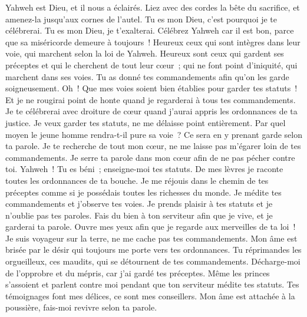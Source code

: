 \begin{multicols}{2}
Yahweh est Dieu, et il nous a éclairés. Liez avec des cordes la bête du sacrifice, et amenez-la jusqu'aux cornes de l'autel.
Tu es mon Dieu, c'est pourquoi je te célébrerai. Tu es mon Dieu, je t'exalterai.
Célébrez Yahweh car il est bon, parce que sa miséricorde demeure à toujours~!
\VerseOne{} Heureux ceux qui sont intègres dans leur voie, qui marchent selon la loi de Yahweh.
Heureux sont ceux qui gardent ses préceptes et qui le cherchent de tout leur cœur~;
qui ne font point d'iniquité, qui marchent dans ses voies.
Tu as donné tes commandements afin qu'on les garde soigneusement.
Oh~! Que mes voies soient bien établies pour garder tes statuts~!
Et je ne rougirai point de honte quand je regarderai à tous tes commandements.
Je te célébrerai avec droiture de cœur quand j'aurai appris les ordonnances de ta justice.
Je veux garder tes statuts, ne me délaisse point entièrement.
 Par quel moyen le jeune homme rendra-t-il pure sa voie~? Ce sera en y prenant garde selon ta parole.
Je te recherche de tout mon cœur, ne me laisse pas m'égarer loin de tes commandements.
Je serre ta parole dans mon cœur afin de ne pas pécher contre toi.
Yahweh~! Tu es béni~; enseigne-moi tes statuts.
De mes lèvres je raconte toutes les ordonnances de ta bouche.
Je me réjouis dans le chemin de tes préceptes comme si je possédais toutes les richesses du monde.
Je médite tes commandements et j'observe tes voies.
Je prends plaisir à tes statuts et je n'oublie pas tes paroles.
 Fais du bien à ton serviteur afin que je vive, et je garderai ta parole.
Ouvre mes yeux afin que je regarde aux merveilles de ta loi~!
Je suis voyageur sur la terre, ne me cache pas tes commandements.
Mon âme est brisée par le désir qui toujours me porte vers tes ordonnances.
Tu réprimandes les orgueilleux, ces maudits, qui se détournent de tes commandements.
Décharge-moi de l'opprobre et du mépris, car j'ai gardé tes préceptes.
Même les princes s'assoient et parlent contre moi pendant que ton serviteur médite tes statuts.
Tes témoignages font mes délices, ce sont mes conseillers.
 Mon âme est attachée à la poussière, fais-moi revivre selon ta parole.

\end{multicols}
